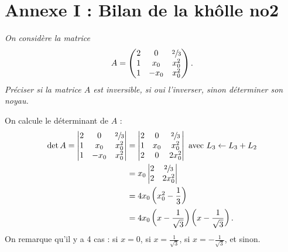 \section*{Annexe I : Bilan de la khôlle n\tsup o2}

\slshape
On considère la matrice \[
	A = \begin{pmatrix}
		2&0&\sfrac{2}{3}\\
		1&x_0&x_0^2\\
		1&-x_0&x_0^2
	\end{pmatrix}
.\]
Préciser si la matrice $A$\/ est inversible, si oui l'inverser, sinon déterminer son noyau.
\upshape

On calcule le déterminant de $A$\/ :
\begin{align*}
	\operatorname{det} A = 
	\begin{vmatrix}
		2&0&\sfrac{2}{3}\\
		1&x_0&x_0^2\\
		1&-x_0&x_0^2
	\end{vmatrix} &= 
	\begin{vmatrix}
		2&0&\sfrac{2}{3}\\
		1&x_0&x_0^2\\
		2&0&2x_0^2
	\end{vmatrix} \text{ avec } L_3 \leftarrow L_3 + L_2\\
	&= x_0
	\begin{vmatrix}
		2&\sfrac{2}{3}\\
		2&2x_0^2
	\end{vmatrix}\\
	&= 4x_0\left( x_0^2 - \frac{1}{3} \right) \\
	&= 4x_0 \left( x-\frac{1}{\sqrt{3}} \right)\left( x-\frac{1}{\sqrt{3}} \right). \\
\end{align*}
On remarque qu'il y a 4 cas : si $x = 0$, si $x = \frac{1}{\sqrt{3}}$, si $x = -\frac{1}{\sqrt{3}}$, et sinon.

